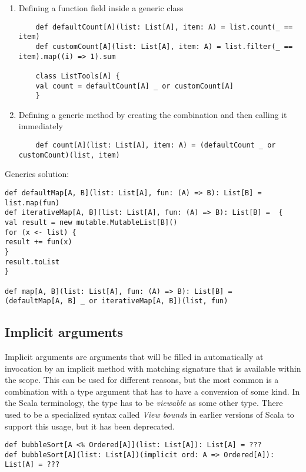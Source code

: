 \begin{enumerate}
	\item Defining a function field inside a generic class
	\lstset{style=Scala}
	\begin{lstlisting}
	def defaultCount[A](list: List[A], item: A) = list.count(_ == item)
	def customCount[A](list: List[A], item: A) = list.filter(_ == item).map((i) => 1).sum
	
	class ListTools[A] {
	val count = defaultCount[A] _ or customCount[A]
	}
	\end{lstlisting}
	\item Defining a generic method by creating the combination and then calling it immediately
	\lstset{style=Scala}
	\begin{lstlisting}
	def count[A](list: List[A], item: A) = (defaultCount _ or customCount)(list, item)
	\end{lstlisting}
\end{enumerate}


Generics solution:
\lstset{style=Scala}
\begin{lstlisting}
def defaultMap[A, B](list: List[A], fun: (A) => B): List[B] = 
list.map(fun)
def iterativeMap[A, B](list: List[A], fun: (A) => B): List[B] =  {
val result = new mutable.MutableList[B]()
for (x <- list) {
result += fun(x)
}
result.toList
}

def map[A, B](list: List[A], fun: (A) => B): List[B] = 
(defaultMap[A, B] _ or iterativeMap[A, B])(list, fun)
\end{lstlisting}

\subsection{Implicit arguments}

Implicit arguments are arguments that will be filled in automatically at invocation by an implicit method with matching signature that is available within the scope. This can be used for different reasons, but the most common is a combination with a type argument that has to have a conversion of some kind. In the Scala terminology, the type has to be \textit{viewable} as some other type. There used to be a specialized syntax called \textit{View bounds} in earlier versions of Scala to support this usage, but it has been deprecated.


\lstset{style=Scala}
\begin{lstlisting}
def bubbleSort[A <% Ordered[A]](list: List[A]): List[A] = ???
def bubbleSort[A](list: List[A])(implicit ord: A => Ordered[A]): List[A] = ???
\end{lstlisting}

